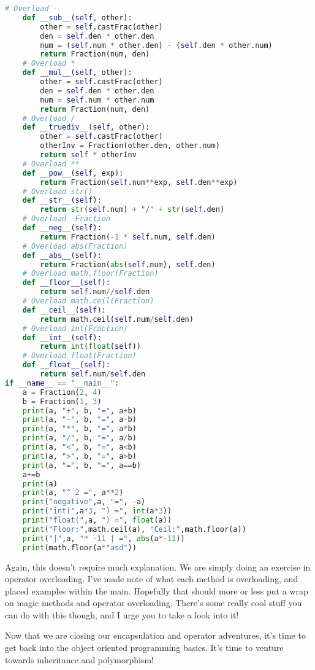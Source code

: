 \documentclass[12pt, twoside, reqno]{book}
\begin{document}
\begin{lstlisting}[language=Python]
    # Overload -
    def __sub__(self, other):
        other = self.castFrac(other)
        den = self.den * other.den
        num = (self.num * other.den) - (self.den * other.num)
        return Fraction(num, den)
    # Overload *
    def __mul__(self, other):
        other = self.castFrac(other)
        den = self.den * other.den
        num = self.num * other.num
        return Fraction(num, den)
    # Overload /
    def __truediv__(self, other):
        other = self.castFrac(other)
        otherInv = Fraction(other.den, other.num)
        return self * otherInv
    # Overload **
    def __pow__(self, exp):
        return Fraction(self.num**exp, self.den**exp)
    # Overload str()
    def __str__(self):
        return str(self.num) + "/" + str(self.den)
    # Overload -Fraction
    def __neg__(self):
        return Fraction(-1 * self.num, self.den)
    # Overload abs(Fraction)
    def __abs__(self):
        return Fraction(abs(self.num), self.den)
    # Overload math.floor(Fraction)
    def __floor__(self):
        return self.num//self.den
    # Overload math.ceil(Fraction)
    def __ceil__(self):
        return math.ceil(self.num/self.den)
    # Overload int(Fraction)
    def __int__(self):
        return int(float(self))
    # Overload float(Fraction)
    def __float__(self):
        return self.num/self.den
if __name__ == "__main__":
    a = Fraction(2, 4)
    b = Fraction(1, 3)
    print(a, "+", b, "=", a+b)
    print(a, "-", b, "=", a-b)
    print(a, "*", b, "=", a*b)
    print(a, "/", b, "=", a/b)
    print(a, "<", b, "=", a<b)
    print(a, ">", b, "=", a>b)
    print(a, "=", b, "=", a==b)
    a+=b
    print(a)
    print(a, "^ 2 =", a**2)
    print("negative",a, "=", -a)
    print("int(",a*3, ") =", int(a*3))
    print("float(",a, ") =", float(a))
    print("Floor:",math.ceil(a), "Ceil:",math.floor(a))
    print("|",a, "* -11 | =", abs(a*-11))
    print(math.floor(a*"asd"))
\end{lstlisting}

Again, this doesn't require much explanation. We are simply doing an exercise in operator overloading. I've made note of what each method is overloading, and placed examples within the main. Hopefully that should more or less put a wrap on magic methods and operator overloading. There's some really cool stuff you can do with this though, and I urge you to take a look into it!

Now that we are closing our encapsulation and operator adventures, it's time to get back into the object oriented programming basics. It's time to venture towards inheritance and polymorphism!
\end{document}
